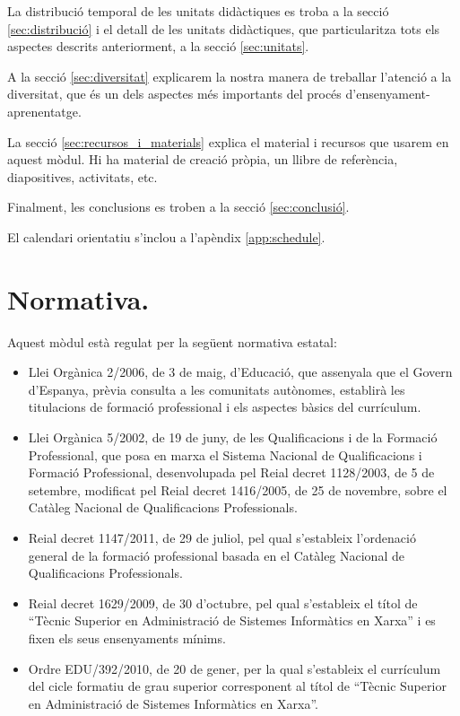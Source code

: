 \documentclass[catalan, a4paper, 12pt, titlepage]{article}
\begin{document}
La distribució temporal de les unitats didàctiques es troba a la secció \ref{sec:distribució} i el detall de les unitats didàctiques, que particularitza tots els aspectes descrits anteriorment, a la secció \ref{sec:unitats}.

A la secció \ref{sec:diversitat} explicarem la nostra manera de treballar l'atenció a la diversitat, que és un dels aspectes més importants del procés d'ensenyament-aprenentatge.

La secció \ref{sec:recursos_i_materials} explica el material i recursos que usarem en aquest mòdul.
Hi ha material de creació pròpia, un llibre de referència, diapositives, activitats, etc.

Finalment, les conclusions es troben a la secció \ref{sec:conclusió}.

El calendari orientatiu s'inclou a l'apèndix \ref{app:schedule}.

\section{Normativa.}
\label{sec:normativa}

Aquest mòdul està regulat per la següent normativa estatal:
\begin{itemize}
	\item Llei Orgànica 2/2006, de 3 de maig, d'Educació, que assenyala que el Govern d'Espanya, prèvia consulta a les comunitats autònomes, establirà les titulacions de formació professional i els aspectes bàsics del currículum.
	\item Llei Orgànica 5/2002, de 19 de juny, de les Qualificacions i de la Formació Professional, que posa en marxa el Sistema Nacional de Qualificacions i Formació Professional, desenvolupada pel Reial decret 1128/2003, de 5 de setembre, modificat pel Reial decret 1416/2005, de 25 de novembre, sobre el Catàleg Nacional de Qualificacions Professionals.
	\item Reial decret 1147/2011, de 29 de juliol, pel qual s'estableix l'ordenació general de la formació professional basada en el Catàleg Nacional de Qualificacions Professionals.
	\item Reial decret 1629/2009, de 30 d'octubre, pel qual s'estableix el títol de ``Tècnic Superior en Administració de Sistemes Informàtics en Xarxa'' i es fixen els seus ensenyaments mínims.
	\item Ordre EDU/392/2010, de 20 de gener, per la qual s'estableix el currículum del cicle formatiu de grau superior corresponent al títol de ``Tècnic Superior en Administració de Sistemes Informàtics en Xarxa''.
\end{itemize}
\end{document}
